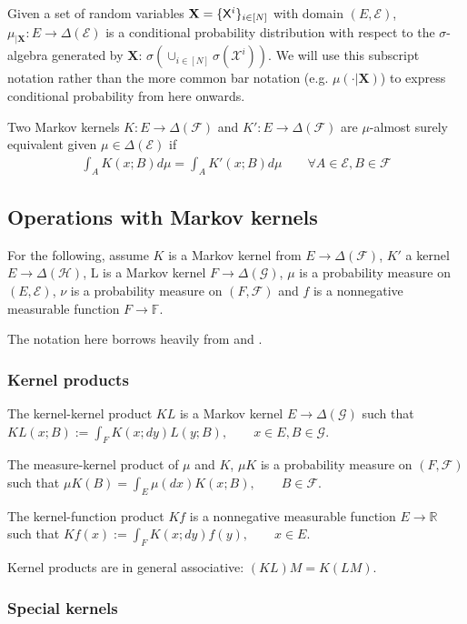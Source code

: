 Given a set of random variables $\mathbf{X}=\{\mathsf{X}^i\}_{i\in [N]}$ with domain $(E,\mathcal{E})$, $\mu_{|\mathbf{X}}:E\to \Delta(\mathcal{E})$ is a conditional probability distribution with respect to the $\sigma$-algebra generated by $\mathbf{X}$: $\sigma(\cup_{i\in[N]}\sigma(\mathcal{X}^i))$.  We will use this subscript notation rather than the more common bar notation (e.g. $\mu(\cdot|\mathbf{X})$) to express conditional probability from here onwards.

Two Markov kernels $K:E\to \Delta(\mathcal{F})$ and $K':E\to \Delta(\mathcal{F})$ are $\mu$-almost surely equivalent given $\mu\in \Delta(\mathcal{E})$ if
\begin{align}
    \int_A K(x;B) d\mu = \int_A K'(x;B) d\mu\qquad\forall A\in \mathcal{E}, B\in\mathcal{F}
\end{align}

\subsection{Operations with Markov kernels}

For the following, assume $K$ is a Markov kernel from $E\to \Delta(\mathcal{F})$, $K'$ a kernel $E\to \Delta(\mathcal{H})$, L is a Markov kernel $F\to \Delta(\mathcal{G})$, $\mu$ is a probability measure on $(E,\mathcal{E})$, $\nu$ is a probability measure on $(F,\mathcal{F})$ and $f$ is a nonnegative measurable function $F\to \mathbb{F}$.

The notation here borrows heavily from \cite{cinlar_probability_2011} and \cite{fong_causal_2013}.

\subsubsection{Kernel products}

The kernel-kernel product $KL$ is a Markov kernel $E\to \Delta(\mathcal{G})$ such that $KL(x;B):= \int_F K(x;dy) L(y;B),\qquad x\in E, B\in \mathcal{G}$.

The measure-kernel product of $\mu$ and $K$, $\mu K$ is a probability measure on $(F,\mathcal{F})$ such that $\mu K(B)=\int_E \mu(dx) K(x;B),\qquad B\in\mathcal{F}$. 

The kernel-function product $Kf$ is a nonnegative measurable function $E\to \mathbb{R}$ such that $Kf(x) := \int_F K(x;dy)f(y), \qquad x\in E$.

Kernel products are in general associative: $(KL)M=K(LM)$.

\subsubsection{Special kernels}


